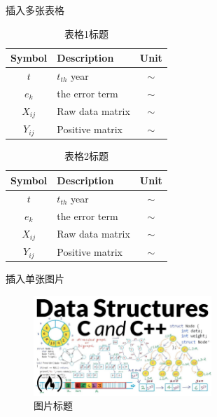 \documentclass[12pt]{beamer}
\begin{document}
\begin{frame}{插入多张表格}
    \begin{minipage}[c]{0.45\textwidth}
        \centering
        \begin{table}[H]
            \centering
            \caption{表格1标题}
                \begin{tabular}{c||lc}
                \toprule
                Symbol  & Description & Unit \\
                \midrule
                $t$ & $t_{th}$ year & $\sim$ \\
                $e_k$ & the error term & $\sim$ \\
                $X_{ij}$ & Raw data matrix & $\sim$ \\
                $Y_{ij}$ & Positive matrix & $\sim$ \\
                \bottomrule
                \end{tabular}%
            \label{tab: 表格1标题}%
        \end{table}%
    \end{minipage}
    \begin{minipage}[c]{0.45\textwidth}
        \centering
        \begin{table}[H]
            \centering
            \caption{表格2标题}
                \begin{tabular}{c||lc}
                \toprule
                Symbol  & Description & Unit \\
                \midrule
                $t$ & $t_{th}$ year & $\sim$ \\
                $e_k$ & the error term & $\sim$ \\
                $X_{ij}$ & Raw data matrix & $\sim$ \\
                $Y_{ij}$ & Positive matrix & $\sim$ \\
                \bottomrule
                \end{tabular}%
            \label{tab: 表格2标题}%
        \end{table}%
    \end{minipage}
\end{frame}

\begin{frame}{插入单张图片}
    \begin{figure}[H] %
        \centering %
        \includegraphics[width=0.6\textwidth]{assets/dataStructures.jpg}
        \caption{图片标题} %
        \label{fig: 数据结构2} %
    \end{figure}
\end{frame}
\end{document}
